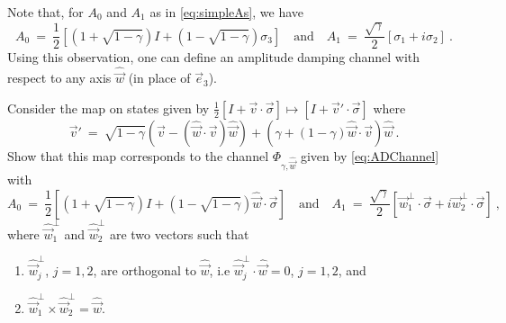\documentclass[12pt]{amsart}
\numberwithin{equation}{section}
\numberwithin{figure}{section}
\theoremstyle{theorem}
\begin{document}
Note that, for $A_0$ and $A_1$ as in \eqref{eq:simpleAs}, we have
$$A_0 \ = \ \frac{1}{2} \left[(1+\sqrt{1-\gamma})I + 
(1-\sqrt{1-\gamma})\sigma_3\right]\quad \text{and} \quad A_1 \ = \ 
\frac{\sqrt{\gamma}}{2} \left[\sigma_1 + i \sigma_2\right] \ . $$
Using this observation, one can define an amplitude damping channel with 
respect to any axis 
$\hat{\vec{w}}$ (in place of $\vec{e}_3$).
\begin{exer}
	Consider the map on states given by $ \frac{1}{2} [I +\vec{v}\cdot 
	\vec{\sigma}] \mapsto [I +\vec{v}'\cdot \vec{\sigma}]$ where
	$$\vec{v}' \ = \ \sqrt{1-\gamma}(\vec{v} - (\hat{\vec{w}}\cdot \vec{v}) 
	\hat{\vec{w}}) + (\gamma+ (1-\gamma) \hat{\vec{w}}\cdot \vec{v}) 
	\hat{\vec{w}} \ . $$
	Show that this map corresponds to the channel $\Phi_{\gamma,\hat{\vec{w}}}$ 
	given by \eqref{eq:ADChannel} with
	$$ A_0 \ = \ \frac{1}{2}\left[(1+\sqrt{1-\gamma})I + 
	(1-\sqrt{1-\gamma})\hat{\vec{w}}\cdot \vec{\sigma}\right] \quad \text{and} 
	\quad A_1 \ = \ \frac{\sqrt{\gamma}}{2} \left[ \vec{w}^\perp_1\cdot 
	\vec{\sigma} + i \vec{w}^\perp_2\cdot \vec{\sigma}  \right] \ ,$$
	where $\hat{\vec{w}}_1^\perp$ and $\hat{\vec{w}}_2^\perp$ are two vectors 
	such that
	\begin{enumerate}
		\item $\hat{\vec{w}}_j^\perp$, $j=1,2$, are orthogonal to 
		$\hat{\vec{w}}$, i.e $\hat{\vec{w}}_j^\perp \cdot \hat{\vec{w}} = 0$, 
		$j=1,2$, and
		\item $\hat{\vec{w}}_1^\perp \times \hat{\vec{w}}_2^\perp = 
		\hat{\vec{w}}$.
	\end{enumerate} 
\end{exer}
\end{document}
